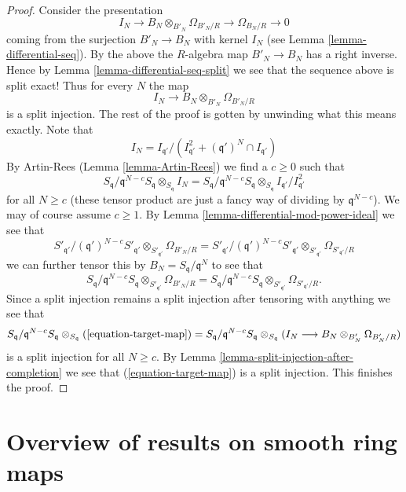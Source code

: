 \begin{proof}
\medskip\noindent
Consider the presentation
$$
I_N \to B_N \otimes_{B'_N} \Omega_{B'_N/R} \to \Omega_{B_N/R} \to 0
$$
coming from the surjection $B'_N \to B_N$ with kernel $I_N$ (see
Lemma \ref{lemma-differential-seq}). By the above the $R$-algebra map
$B'_N \to B_N$ has a right inverse. Hence by
Lemma \ref{lemma-differential-seq-split} we see that the sequence above
is split exact! Thus for every $N$ the map
$$
I_N \longrightarrow B_N \otimes_{B'_N} \Omega_{B'_N/R}
$$
is a split injection. The rest of the proof is gotten by unwinding what
this means exactly. Note that
$$
I_N = I_{\mathfrak q'}/
(I_{\mathfrak q'}^2 + (\mathfrak q')^N \cap I_{\mathfrak q'})
$$
By Artin-Rees (Lemma \ref{lemma-Artin-Rees}) we find a $c \geq 0$
such that
$$
S_{\mathfrak q}/\mathfrak q^{N - c}S_{\mathfrak q}
\otimes_{S_{\mathfrak q}} I_N =
S_{\mathfrak q}/\mathfrak q^{N - c}S_{\mathfrak q}
\otimes_{S_{\mathfrak q}}
I_{\mathfrak q'}/I_{\mathfrak q'}^2
$$
for all $N \geq c$
(these tensor product are just a fancy way of dividing by
$\mathfrak q^{N - c}$). We may of course assume $c \geq 1$.
By Lemma \ref{lemma-differential-mod-power-ideal} we see that
$$
S'_{\mathfrak q'}/(\mathfrak q')^{N - c}S'_{\mathfrak q'}
\otimes_{S'_{\mathfrak q'}} \Omega_{B'_N/R} =
S'_{\mathfrak q'}/(\mathfrak q')^{N - c}S'_{\mathfrak q'}
\otimes_{S'_{\mathfrak q'}} \Omega_{S'_{\mathfrak q'}/R}
$$
we can further tensor this by $B_N = S_{\mathfrak q}/\mathfrak q^N$
to see that
$$
S_{\mathfrak q}/\mathfrak q^{N - c}S_{\mathfrak q}
\otimes_{S'_{\mathfrak q'}} \Omega_{B'_N/R} =
S_{\mathfrak q}/\mathfrak q^{N - c}S_{\mathfrak q}
\otimes_{S'_{\mathfrak q'}} \Omega_{S'_{\mathfrak q'}/R}.
$$
Since a split injection remains a split injection after tensoring
with anything we see that
$$
S_{\mathfrak q}/\mathfrak q^{N - c}S_{\mathfrak q}
\otimes_{S_{\mathfrak q}}
(\ref{equation-target-map}) =
S_{\mathfrak q}/\mathfrak q^{N - c}S_{\mathfrak q}
\otimes_{S_{\mathfrak q}}
(I_N \longrightarrow B_N \otimes_{B'_N} \Omega_{B'_N/R})
$$
is a split injection for all $N \geq c$. By
Lemma \ref{lemma-split-injection-after-completion} we see that
(\ref{equation-target-map}) is a split injection. This finishes the proof.
\end{proof}








\section{Overview of results on smooth ring maps}
\label{section-smooth-overview}

